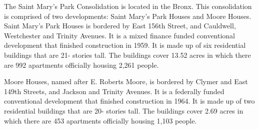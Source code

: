 The Saint Mary's Park Consolidation is located in the Bronx. This consolidation is comprised of two developments: Saint Mary's Park Houses and Moore Houses. Saint Mary's Park Houses is bordered by East 156th Street, and Cauldwell, Westchester and Trinity Avenues. It is a mixed finance funded conventional development that finished construction in 1959. It is made up of six residential buildings that are 21- stories tall. The buildings cover 13.52 acres in which there are 992 apartments officially housing 2,261 people.\par \vspace{.7\baselineskip}Moore Houses, named after E. Roberts Moore, is bordered by Clymer and East 149th Streets, and Jackson and Trinity Avenues. It is a federally funded conventional development that finished construction in 1964. It is made up of two residential buildings that are 20- stories tall. The buildings cover 2.69 acres in which there are 453 apartments officially housing 1,103 people.